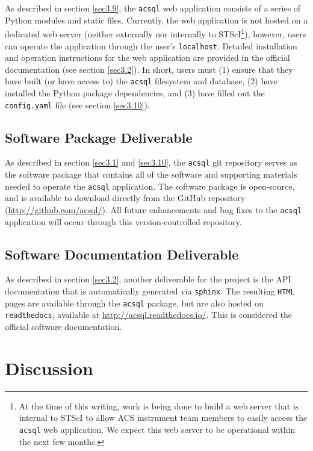 \documentclass[10pt,journal,compsoc]{IEEEtran}
\begin{document}
As described in section \ref{sec3.9}, the \texttt{acsql} web application consists of a series of Python modules and static files.  Currently, the web application is not hosted on a
dedicated web server (neither externally nor internally to STScI\footnote{At the time of this writing, work is being done to build a web server that is internal to STScI to allow ACS instrument
team members to easily access the \texttt{acsql} web application.  We expect this web server to be operational within the next few months.}), however, users can operate the application through
the user's \texttt{localhost}.  Detailed installation and operation instructions for the web application are provided in the official documentation (see section \ref{sec3.2}).  In short,
users must (1) ensure that they have built (or have access to) the \texttt{acsql} filesystem and database, (2) have installed the Python package dependencies, and (3) have filled out the
\texttt{config.yaml} file (see section \ref{sec3.10}).


\subsection{Software Package Deliverable} \label{sec4.4}

As described in section \ref{sec3.1} and \ref{sec3.10}, the \texttt{acsql} git repository serves as the software package that contains all of the software and supporting materials needed to
operate the \texttt{acsql} application.  The software package is open-source, and is available to download directly from the GitHub repository (\textcolor{blue}{\url{http://github.com/acsql/}}).
All future enhancements and bug fixes to the \texttt{acsql} application will occur through this version-controlled repository.


\subsection{Software Documentation Deliverable} \label{sec4.5}

As described in section \ref{sec3.2}, another deliverable for the project is the API documentation that is automatically generated via \texttt{sphinx}.  The resulting \texttt{HTML} pages are
available through the \texttt{acsql} package, but are also hosted on \texttt{readthedocs}, available at \textcolor{blue}{\url{http://acsql.readthedocs.io/}}.  This is considered the official software
documentation.


\section{Discussion} \label{chap5}
\end{document}
